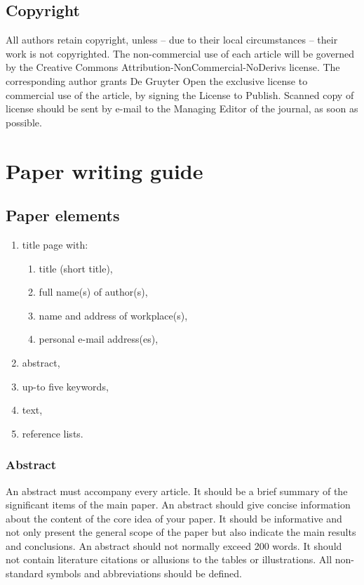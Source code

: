 \documentclass[USenglish,oneside,twocolumn]{article}
\begin{document}
\subsection{Copyright  }

All authors retain copyright, unless -- due to their local circumstances -- their work is not copyrighted. The non-commercial use of each article will be governed by the Creative Commons Attribution-NonCommercial-NoDerivs license. The corresponding author grants De Gruyter Open the exclusive license to commercial use of the article, by signing the License to Publish. Scanned copy of license should be sent by e-mail to the Managing Editor of the journal, as soon as possible.


\section{Paper writing guide}

\subsection{Paper elements}

\begin{enumerate}
\item title page with:
    \begin{enumerate}
    \item title (short title),
    \item full name(s) of author(s),
    \item name and address of workplace(s),
    \item personal e-mail address(es),
    \end{enumerate}
\item abstract,
\item up-to five keywords,
\item text,
\item reference lists.
\end{enumerate}


\subsubsection{Abstract}

An abstract must accompany every article. It should be a brief summary of the significant items of the main paper. An abstract should give concise information about the content of the core idea of your paper. It should be informative and not only present the general scope of the paper but also indicate the main results and conclusions. An abstract should not normally exceed 200 words. It should not contain literature citations or allusions to the tables or illustrations. All non-standard symbols and abbreviations should be defined.
\end{document}
